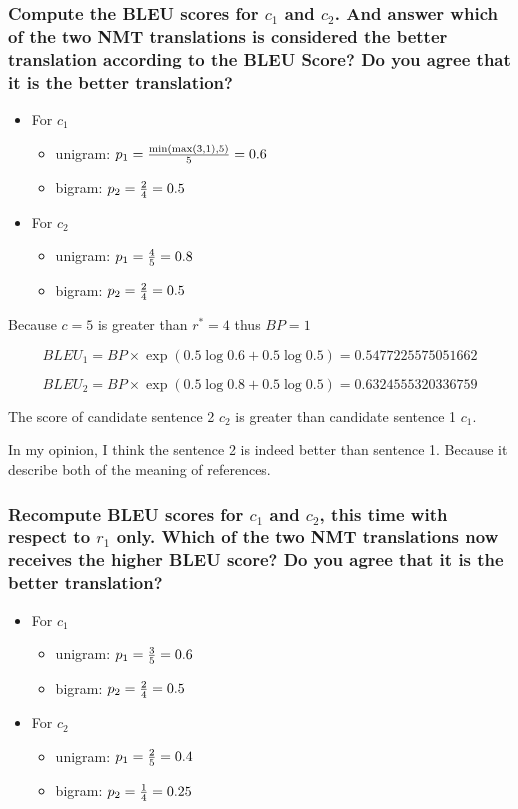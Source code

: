 \documentclass[12pt, letterpaper]{article}
\begin{document}
\subsubsection{Compute the BLEU scores for $c_1$ and $c_2$. And answer which of the two NMT translations is considered the better translation according to the BLEU Score? Do you agree that it is the better translation?}

\begin{itemize}[topsep=0pt, partopsep=0pt]
  \item For $c_1$ {
    \begin{itemize}
      \item unigram: $p_1 = {\min(\max(3, 1), 5) \over 5} = 0.6$
      \item bigram: $p_2 = {2 \over 4} = 0.5$
    \end{itemize}
  }
  \item For $c_2$ {
    \begin{itemize}
      \item unigram: $p_1 = {4 \over 5} = 0.8$
      \item bigram: $p_2 = {2 \over 4} = 0.5$
    \end{itemize}
  }
\end{itemize}

Because $c = 5$ is greater than $r^* = 4$ thus $BP = 1$

$$
BLEU_1 = BP \times \exp(0.5 \log 0.6 + 0.5 \log 0.5) = 0.5477225575051662
$$

$$
BLEU_2 = BP \times \exp(0.5 \log 0.8 + 0.5 \log 0.5) = 0.6324555320336759
$$

The score of candidate sentence 2 $c_2$ is greater than candidate sentence 1 $c_1$.

In my opinion, I think the sentence 2 is indeed better than sentence 1. Because it describe both of the meaning of references.

\subsubsection{Recompute BLEU scores for $c_1$ and $c_2$, this time with respect to $r_1$ only. Which of the two NMT translations now receives the higher BLEU score? Do you agree that it is the better translation?}

\begin{itemize}[topsep=0pt, partopsep=0pt]
  \item For $c_1$ {
    \begin{itemize}
      \item unigram: $p_1 = {3 \over 5} = 0.6$
      \item bigram: $p_2 = {2 \over 4} = 0.5$
    \end{itemize}
  }
  \item For $c_2$ {
    \begin{itemize}
      \item unigram: $p_1 = {2 \over 5} = 0.4$
      \item bigram: $p_2 = {1 \over 4} = 0.25$
    \end{itemize}
  }
\end{itemize}
\end{document}

